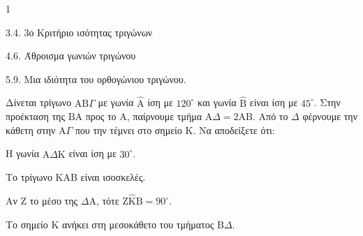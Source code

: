 \begin{ylh}{1}
    \item 3.4. 3ο Κριτήριο ισότητας τριγώνων
    \item 4.6. Άθροισμα γωνιών τριγώνου
    \item 5.9. Μια ιδιότητα του ορθογώνιου τριγώνου.
\end{ylh}
Δίνεται τρίγωνο $\mathrm{A}\mathrm{B}\Gamma$ με γωνία $\hat{\mathrm{A}}$ ίση με $120^\circ$ και γωνία $\hat{\mathrm{B}}$ είναι ίση με $45^\circ$. Στην προέκταση της $\mathrm{B}\mathrm{A}$ προς το $\mathrm{A}$, παίρνουμε τμήμα $\mathrm{A}\Delta = 2\mathrm{A}\mathrm{B}$. Από το $\Delta$ φέρνουμε την κάθετη στην $\mathrm{A}\Gamma$ που την τέμνει στο σημείο $\mathrm{K}$.
Να αποδείξετε ότι:
\begin{alist}
    \item Η γωνία $\mathrm{A}\hat{\Delta}\mathrm{K}$ είναι ίση με $30^\circ$. 
    \item Το τρίγωνο $\mathrm{K}\mathrm{A}\mathrm{B}$ είναι ισοσκελές. 
    \item Αν $\mathrm{Z}$ το μέσο της $\Delta\mathrm{A}$, τότε $\mathrm{Z}\hat{\mathrm{K}}\mathrm{B} = 90^\circ$. 
    \item Το σημείο $\mathrm{K}$ ανήκει στη μεσοκάθετο του τμήματος $\mathrm{B}\Delta$. 
\end{alist}
